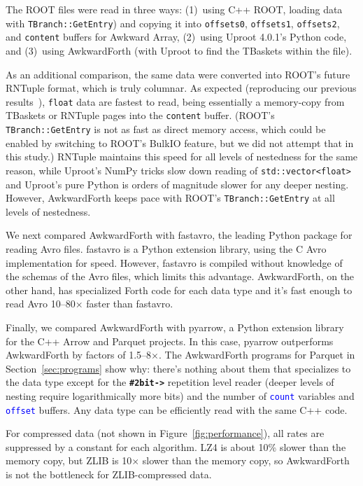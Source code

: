 \documentclass{webofc}
\begin{document}
The ROOT files were read in three ways: (1)~using C++ ROOT, loading data with \texttt{TBranch::GetEntry}) and copying it into \texttt{offsets0}, \texttt{offsets1}, \texttt{offsets2}, and \texttt{content} buffers for Awkward Array, (2)~using Uproot 4.0.1's Python code, and (3)~using AwkwardForth (with Uproot to find the TBaskets within the file).

As an additional comparison, the same data were converted into ROOT's future RNTuple format, which is truly columnar. As expected (reproducing our previous results~\cite{chep2019}), \texttt{float} data are fastest to read, being essentially a memory-copy from TBaskets or RNTuple pages into the \texttt{content} buffer. (ROOT's \texttt{TBranch::GetEntry} is not as fast as direct memory access, which could be enabled by switching to ROOT's BulkIO feature, but we did not attempt that in this study.) RNTuple maintains this speed for all levels of nestedness for the same reason, while Uproot's NumPy tricks slow down reading of \texttt{std::vector<float>} and Uproot's pure Python is orders of magnitude slower for any deeper nesting. However, AwkwardForth keeps pace with ROOT's \texttt{TBranch::GetEntry} at all levels of nestedness.

We next compared AwkwardForth with fastavro, the leading Python package for reading Avro files. fastavro is a Python extension library, using the C Avro implementation for speed. However, fastavro is compiled without knowledge of the schemas of the Avro files, which limits this advantage. AwkwardForth, on the other hand, has specialized Forth code for each data type and it's fast enough to read Avro 10--80$\times$ faster than fastavro.

Finally, we compared AwkwardForth with pyarrow, a Python extension library for the C++ Arrow and Parquet projects. In this case, pyarrow outperforms AwkwardForth by factors of 1.5--8$\times$. The AwkwardForth programs for Parquet in Section~\ref{sec:programs} show why: there's nothing about them that specializes to the data type except for the \textcolor{OliveGreen}{\tt\textbf{\#2bit->}} repetition level reader (deeper levels of nesting require logarithmically more bits) and the number of \textcolor{blue}{\tt count} variables and \textcolor{blue}{\tt offset} buffers. Any data type can be efficiently read with the same C++ code.

For compressed data (not shown in Figure~\ref{fig:performance}), all rates are suppressed by a constant for each algorithm. LZ4 is about 10\% slower than the memory copy, but ZLIB is 10$\times$ slower than the memory copy, so AwkwardForth is not the bottleneck for ZLIB-compressed data.
\end{document}
